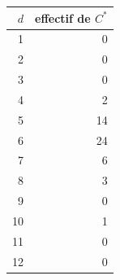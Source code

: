 \begin{tabular}{r r}
\toprule
{\(d\)} & {effectif de \(C^{*}\)} \\
\midrule
1 & 0 \\
2 & 0 \\
3 & 0 \\
4 & 2 \\
5 & 14 \\
6 & 24 \\
7 & 6 \\
8 & 3 \\
9 & 0 \\
10 & 1 \\
11 & 0 \\
12 & 0 \\
\bottomrule
\end{tabular}
